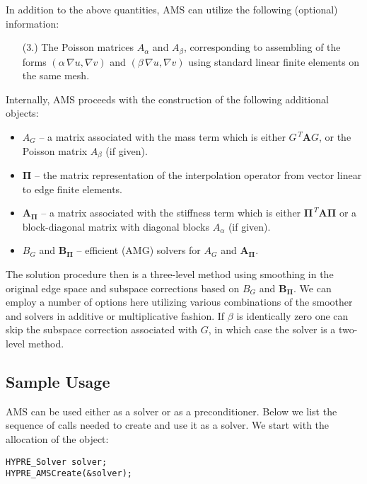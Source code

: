 In addition to the above quantities, AMS can utilize
the following (optional) information:
\begin{enumerate}
\item[(3.)] The Poisson matrices $A_\alpha$ and $A_\beta$, corresponding to
assembling of the forms $(\alpha\, \nabla u, \nabla v)$
and $(\beta\, \nabla u, \nabla v)$ using standard linear finite elements on
the same mesh.
\end{enumerate}

\noindent
Internally, AMS proceeds with the construction of the following additional objects:
\begin{itemize}
\item $A_G$ -- a matrix associated with the mass term which is either $G^{\,T} {\mathbf A} G$, or the Poisson matrix $A_\beta$ (if given).
\item ${\mathbf \Pi}$ -- the matrix representation of the interpolation operator
from vector linear to edge finite elements.
\item ${\mathbf A}_{{\mathbf \Pi}}$ -- a matrix associated with the stiffness term which is either  ${\mathbf \Pi}^{\,T} {\mathbf A} {\mathbf \Pi}$ or a block-diagonal matrix with diagonal blocks $A_\alpha$ (if given).
\item $B_G$ and ${\mathbf B}_{{\mathbf \Pi}}$ -- efficient (AMG) solvers for $A_G$ and ${\mathbf A}_{{\mathbf \Pi}}$.
\end{itemize}
The solution procedure then is a three-level method using smoothing in
the original edge space and subspace corrections based on $B_G$ and ${\mathbf B}_{{\mathbf \Pi}}$.
We can employ a number of options here utilizing various combinations of the smoother
and solvers in additive or multiplicative fashion.
If $\beta$ is identically zero one can skip the subspace correction associated
with $G$, in which case the solver is a two-level method.

\subsection{Sample Usage}
AMS can be used either as a solver or as a preconditioner.
Below we list the sequence of \hypre{} calls
needed to create and use it as a solver.
We start with the allocation of the  object:
\begin{display}\begin{verbatim}
HYPRE_Solver solver;
HYPRE_AMSCreate(&solver);
\end{verbatim}\end{display}

